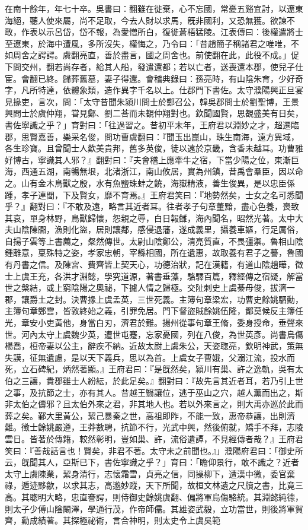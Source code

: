 \begin{pinyinscope}
在南十餘年，年七十卒。吳書曰：翻雖在徙棄，心不忘國，常憂五谿宜討，以遼東海絕，聽人使來屬，尚不足取，今去人財以求馬，旣非國利，又恐無獲。欲諫不敢，作表以示呂岱，岱不報，為愛憎所白，復徙蒼梧猛陵。江表傳曰：後權遣將士至遼東，於海中遭風，多所沒失，權悔之，乃令曰：「昔趙簡子稱諸君之唯唯，不如周舍之諤諤。虞翻亮直，善於盡言，國之周舍也。前使翻在此，此役不成。」促下問交州，翻若尚存者，給其人船，發遣還都；若以亡者，送喪還本郡，使兒子仕宦。會翻已終。歸葬舊墓，妻子得還。會稽典錄曰：孫亮時，有山陰朱育，少好奇字，凡所特達，依體象類，造作異字千名以上。仕郡門下書佐。太守濮陽興正旦宴見掾吏，言次，問：「太守昔聞朱潁川問士於鄭召公，韓吳郡問士於劉聖博，王景興問士於虞仲翔，甞見鄭、劉二荅而未覩仲翔對也。欽聞國賢，思覩盛美有日矣，書佐寧識之乎？」育對曰：「往過習之。昔初平末年，王府君以淵妙之才，超遷臨郡，思賢嘉善，樂采名俊，問功曹虞翻曰：『聞玉出崑山，珠生南海，遠方異域，各生珍寶。且曾聞士人歎美貴邦，舊多英俊，徒以遠於京畿，含香未越耳。功曹雅好博古，寧識其人邪？』翻對曰：『夫會稽上應牽牛之宿，下當少陽之位，東漸巨海，西通五湖，南暢無垠，北渚浙江，南山攸居，實為州鎮，昔禹會羣臣，因以命之。山有金木鳥獸之殷，水有魚鹽珠蚌之饒，海嶽精液，善生俊異，是以忠臣係踵，孝子連閭，下及賢女，靡不育焉。』王府君笑曰：『地勢然矣，士女之名可悉聞乎？』翻對曰：『不敢及遠，略言其近者耳。往者孝子句章董黯，盡心色養，喪致其哀，單身林野，鳥獸歸懷，怨親之辱，白日報讎，海內聞名，昭然光著。太中大夫山陰陳嚻，漁則化盜，居則讓鄰，感侵退藩，遂成義里，攝養車嫗，行足厲俗，自揚子雲等上書薦之，粲然傳世。太尉山陰鄭公，清亮質直，不畏彊禦。魯相山陰鍾離意，稟殊特之姿，孝家忠朝，宰縣相國，所在遺惠，故取養有君子之謩，魯國有丹書之信。及陳宮、費齊皆上契天心，功德治狀，記在漢籍，有道山陰趙曄，徵士上虞王充，各洪才淵懿，學究道源，著書垂藻，駱驛百篇，釋經傳之宿疑，解當世之槃結，或上窮陰陽之奧祕，下攄人情之歸極。交阯刺史上虞綦毋俊，拔濟一郡，讓爵土之封。決曹掾上虞孟英，三世死義。主簿句章梁宏，功曹史餘姚駟勳，主簿句章鄭雲，皆敦終始之義，引罪免居。門下督盜賊餘姚伍隆，鄮莫候反主簿任光，章安小吏黃他，身當白刃，濟君於難。揚州從事句章王脩，委身授命，垂聲來世。河內太守上虞魏少英，遭世屯蹇，忘家憂國，列在八俊，為世英彥。尚書烏傷楊喬，桓帝妻以公主，辭疾不納。近故太尉上虞朱公，天姿聦亮，欽明神武，策無失謨，征無遺慮，是以天下義兵，思以為首。上虞女子曹娥，父溺江流，投水而死，立石碑紀，炳然著顯。』王府君曰：『是旣然矣，潁川有巢、許之逸軌，吳有太伯之三讓，貴郡雖士人紛紜，於此足矣。』翻對曰：『故先言其近者耳，若乃引上世之事，及抗節之士，亦有其人。昔越王翳讓位，逃于巫山之穴，越人薰而出之，斯非太伯之儔邪？且太伯外來之君，非其地人也。若以外來言之，則大禹亦巡於此而葬之矣。鄞大里黃公，絜己暴秦之世，高祖即阼，不能一致，惠帝恭讓，出則濟難。徵士餘姚嚴遵，王莽數聘，抗節不行，光武中興，然後俯就，矯手不拜，志陵雲日。皆著於傳籍，較然彰明，豈如巢、許，流俗遺譚，不見經傳者哉？』王府君笑曰：『善哉話言也！賢矣，非君不著。太守未之前聞也。』」濮陽府君曰：「御史所云，旣聞其人，亞斯已下，書佐寧識之乎？」育曰：「瞻仰景行，敢不識之？近者太守上虞陳業，絜身清行，志懷霜雪，貞亮之信，同操柳下，遭漢中微，委官棄祿，遁迹黟歙，以求其志，高邈妙蹤，天下所聞，故桓文林遺之尺牘之書，比竟三高。其聦明大略，忠直謇諤，則侍御史餘姚虞翻、偏將軍烏傷駱統。其淵懿純德，則太子少傅山陰闞澤，學通行茂，作帝師儒。其雄姿武毅，立功當世，則後將軍賀齊，勳成績著。其探極祕術，言合神明，則太史令上虞吳範
\end{pinyinscope}
